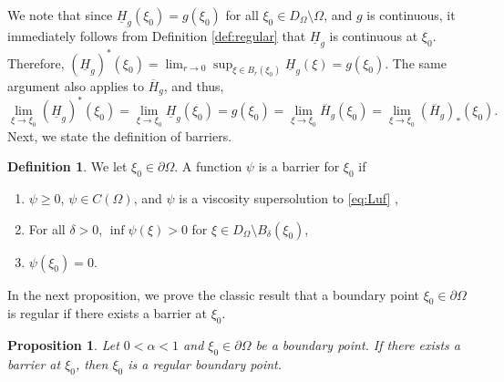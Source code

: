 \documentclass[11pt]{article}
\providecommand{\Rnp}{D_{\Omega}}
\providecommand{\RnpO}{D_{\Omega}\setminus \Omega}
\providecommand{\ups}{\overline{H}_g}
\providecommand{\lps}{\underline{H}_g}
\newtheorem{prop}[thm]{Proposition}
\numberwithin{equation}{section}
\theoremstyle{definition}
\newtheorem{definition}[thm]{Definition}
\begin{document}
We note that since $\lps(\xi_0) =g(\xi_0)$ for all $\xi_0 \in \RnpO$, and $g$ is continuous, it immediately follows from Definition \ref{def:regular} that $\lps$ is continuous at $\xi_0$. Therefore, $(\lps)^*(\xi_0) = \lim_{r \to 0} \sup_{\xi \in B_r(\xi_0)} \lps(\xi) = g(\xi_0)$. The same argument also applies to $\ups$, and thus,
\begin{equation}\label{eq:regular2}
    \lim_{\xi \to \xi_0} (\lps)^*(\xi_0) = \lim_{\xi \to \xi_0} \lps(\xi_0) =g(\xi_0)= \lim_{\xi \to \xi_0} \ups(\xi_0)  = \lim_{\xi \to \xi_0} (\ups)_*(\xi_0).
\end{equation}
 Next, we state the definition of barriers.
\begin{definition}\label{def:barrier}
   We let $\xi_0 \in \partial \Omega $. A function $\psi$ is a barrier for $\xi_0$ if 
   \begin{enumerate}
       \item $\psi \geq 0$, $\psi \in C(\Omega)$, and $\psi$ is a viscosity supersolution to \eqref{eq:Luf} ,
       \item For all $\delta >0$, $\inf \psi(\xi) >0$ for $ \xi \in \Rnp \setminus B_{\delta}(\xi_0)$,
       \item $ \psi(\xi_0)=0$.
   \end{enumerate}
\end{definition}
In the next proposition, we prove the classic result that a boundary point $\xi_0 \in \partial \Omega$ is regular if there exists a barrier at $\xi_0$.
\begin{prop}\label{prop:regular}
    Let $0<\alpha<1$ and $\xi_0 \in \partial \Omega $ be a boundary point. If there exists a barrier at $\xi_0$, then $\xi_0$ is a regular boundary point. 
\end{prop}
\end{document}
